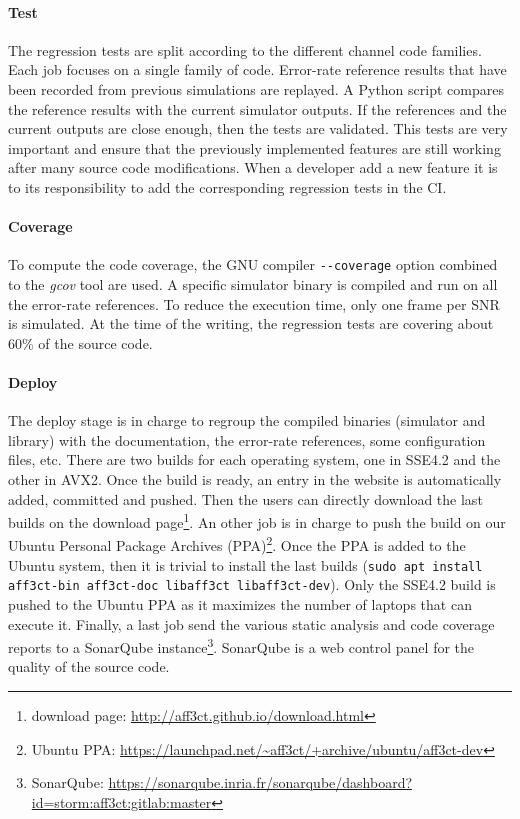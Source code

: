 \paragraph{Test}

The regression tests are split according to the different channel code families.
Each job focuses on a single family of code. Error-rate reference results that
have been recorded from previous simulations are replayed. A Python script
compares the reference results with the current simulator outputs. If the
references and the current outputs are close enough, then the tests are
validated. This tests are very important and ensure that the previously
implemented features are still working after many source code modifications.
When a developer add a new feature it is to its responsibility to add the
corresponding regression tests in the CI.

\paragraph{Coverage}

To compute the code coverage, the GNU compiler \verb|--coverage| option combined
to the \emph{gcov} tool are used. A specific \AFFECT simulator binary is
compiled and run on all the error-rate references. To reduce the execution time,
only one frame per SNR is simulated. At the time of the writing, the regression
tests are covering about 60\% of the \AFFECT source code.

\paragraph{Deploy}

The deploy stage is in charge to regroup the \AFFECT compiled binaries
(simulator and library) with the documentation, the error-rate references, some
configuration files, etc. There are two builds for each operating system, one in
SSE4.2 and the other in AVX2. Once the build is ready, an entry in the \AFFECT
website is automatically added, committed and pushed. Then the users can
directly download the last builds on the \AFFECT download page\footnote{\AFFECT
download page: \url{http://aff3ct.github.io/download.html}}. An other job is in
charge to push the \AFFECT build on our Ubuntu Personal Package Archives
(PPA)\footnote{\AFFECT Ubuntu PPA: \url{https://launchpad.net/~aff3ct/+archive/ubuntu/aff3ct-dev}}.
Once the \AFFECT PPA is added to the Ubuntu system, then it is trivial to
install the last \AFFECT builds
(\verb|sudo apt install aff3ct-bin aff3ct-doc libaff3ct libaff3ct-dev|). Only
the SSE4.2 build is pushed to the Ubuntu PPA as it maximizes the number of
laptops that can execute it. Finally, a last job send the various static
analysis and code coverage reports to a SonarQube instance\footnote{\AFFECT
SonarQube: \url{https://sonarqube.inria.fr/sonarqube/dashboard?id=storm:aff3ct:gitlab:master}}.
SonarQube is a web control panel for the quality of the source code.


